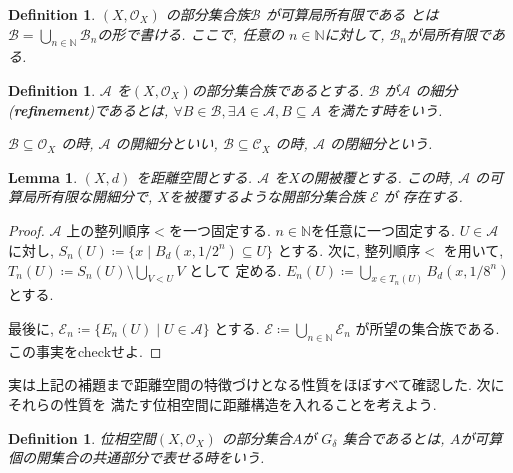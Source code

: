 \documentclass[lualatex]{ltjsbook}
\newtheorem{lemma}[theorem]{Lemma}
\newtheorem{definition}[theorem]{Definition}
\theoremstyle{remark}
\theoremstyle{plain}
\begin{document}
\begin{definition}
  $\left( X , \mathcal{O}_{X} \right)$ の部分集合族$\mathcal{B}$ が可算局所有限である
  とは$\mathcal{B} = \bigcup_{n \in \mathbb{N}} \mathcal{B}_n$の形で書ける. ここで, 任意の
  $n \in \mathbb{N}$に対して, $\mathcal{B}_n$が局所有限である.
\end{definition}

\begin{definition}
  $\mathcal{A}$ を$\left( X , \mathcal{O}_{X} \right)$の部分集合族であるとする.  $\mathcal{B}$ が$\mathcal{A}$ の細分(\textbf{refinement})であるとは, 
  $\forall  B \in \mathcal{B}, \exists A \in \mathcal{A}, B \subseteq A$ を満たす時をいう. 

  $\mathcal{B} \subseteq \mathcal{O}_X$ の時, $\mathcal{A}$ の開細分といい, 
  $\mathcal{B} \subseteq \mathcal{C}_X$ の時, $\mathcal{A}$ の閉細分という.

\end{definition}

\begin{lemma}
\label{lemma:open-refinement}
  $\left( X , d\right)$ を距離空間とする. $\mathcal{A}$ を$X$の開被覆とする. この時, 
   $\mathcal{A}$ の可算局所有限な開細分で, $X$を被覆するような開部分集合族 $\mathcal{E}$ が
   存在する. 
\end{lemma}

\begin{proof}
  $\mathcal{A}$ 上の整列順序$<$を一つ固定する. $n \in \mathbb{N}$を任意に一つ固定する. 
  $U \in \mathcal{A}$に対し, $S_n(U) \coloneqq \{x  \mid B_d(x, 1/ 2^n ) \subseteq U\} $ とする. 
   次に, 整列順序$<$ を用いて, $T_n(U) \coloneqq S_n(U) \setminus \bigcup_{V < U} V $ として
   定める. 
   $E_n(U) \coloneqq \bigcup_{x \in T_n(U)}B_d(x,1/8^n)  $ とする.

   最後に, $\mathcal{E}_n \coloneqq \{E_n(U)  \mid U \in \mathcal{A}\} $ とする. 
   $\mathcal{E}\coloneqq \bigcup_{n \in \mathbb{N}} \mathcal{E}_n$ が所望の集合族である. この事実をcheckせよ.
\end{proof}

実は上記の補題まで距離空間の特徴づけとなる性質をほぼすべて確認した. 次にそれらの性質を
満たす位相空間に距離構造を入れることを考えよう. 

\begin{definition}
  位相空間$\left( X , \mathcal{O}_{X} \right)$ の部分集合$A$が $G_{\delta}$ 集合であるとは, 
  $A$が可算個の開集合の共通部分で表せる時をいう.
  
\end{definition}
\end{document}
